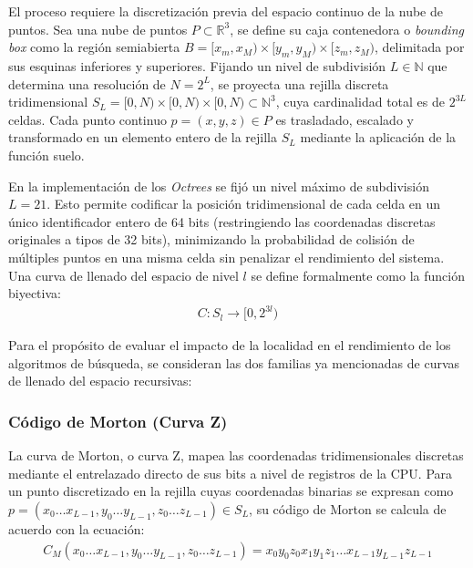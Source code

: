 El proceso requiere la discretización previa del espacio continuo de la nube de puntos. Sea una nube de puntos $P \subset \mathbb{R}^3$, se define su caja contenedora o \textit{bounding box} como la región semiabierta $B = [x_m, x_M) \times [y_m, y_M) \times [z_m, z_M)$, delimitada por sus esquinas inferiores y superiores. Fijando un nivel de subdivisión $L \in \mathbb{N}$ que determina una resolución de $N = 2^L$, se proyecta una rejilla discreta tridimensional $S_L = [0, N) \times [0, N) \times [0, N) \subset \mathbb{N}^3$, cuya cardinalidad total es de $2^{3L}$ celdas. Cada punto continuo $p = (x,y,z) \in P$ es trasladado, escalado y transformado en un elemento entero de la rejilla $S_L$ mediante la aplicación de la función suelo.

En la implementación de los \textit{Octrees} se fijó un nivel máximo de subdivisión $L = 21$. Esto permite codificar la posición tridimensional de cada celda en un único identificador entero de 64 bits (restringiendo las coordenadas discretas originales a tipos de 32 bits), minimizando la probabilidad de colisión de múltiples puntos en una misma celda sin penalizar el rendimiento del sistema. Una curva de llenado del espacio de nivel $l$ se define formalmente como la función biyectiva:
\[
\begin{aligned}
    C: S_l \longrightarrow [0, 2^{3l})
\end{aligned}\]

Para el propósito de evaluar el impacto de la localidad en el rendimiento de los algoritmos de búsqueda, se consideran las dos familias ya mencionadas de curvas de llenado del espacio recursivas:

\subsubsection{Código de Morton (Curva Z)}
La curva de Morton, o curva Z, mapea las coordenadas tridimensionales discretas mediante el entrelazado directo de sus bits a nivel de registros de la CPU. Para un punto discretizado en la rejilla cuyas coordenadas binarias se expresan como $p = (x_0 \dots x_{L-1}, y_0 \dots y_{L-1}, z_0 \dots z_{L-1}) \in S_L$, su código de Morton se calcula de acuerdo con la ecuación:
\[\begin{aligned}
    C_M(x_0 \dots x_{L-1}, y_0 \dots y_{L-1}, z_0 \dots z_{L-1}) = x_0 y_0 z_0 x_1 y_1 z_1 \dots x_{L-1} y_{L-1} z_{L-1}
\end{aligned}\]



